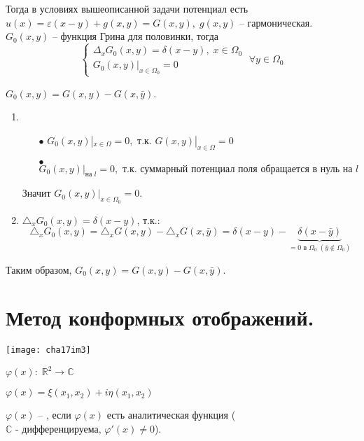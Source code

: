 Тогда в условиях вышеописанной задачи потенциал есть $ u(x) = \varepsilon(x - y) + g(x,y) = G(x, y), \; g(x, y)$ -- гармоническая. $ G_0(x, y) $ -- функция Грина для половинки, тогда
$$\begin{cases}
	\Delta_x G_0(x, y) = \delta(x - y), \; x \in \Omega_0 \\
	G_0(x, y)|_{x \in \Omega_0} = 0
\end{cases} \; \forall y \in \Omega_0$$
\begin{theorem}[]\label{lec:17/the:1}
	$ G_0(x, y) = G(x, y) - G(x, \bar{y}) $.
\end{theorem}
\begin{Proof}
	\begin{enumerate}
		\item 
			\begin{itemize}
				\item[$\bullet$]
					$G_0(x, y)|_{x \in \Omega} = 0, \text{ т.к. } G(x, y)|_{x \in \Omega} = 0$
				\item[$\bullet$]
					$G_0(x, y)|_{\text{на } l} = 0, \text{ т.к. суммарный потенциал поля обращается }\text{в нуль на } l$
			\end{itemize}
			Значит $ G_0(x, y)|_{x \in \Omega_0} = 0 $.
		\item 
			$ \triangle_x G_0(x, y) = \delta(x-y) $, т.к.:
			$$\triangle_x G_0(x, y) = \triangle_x G(x, y) - \triangle_x G(x, \bar{y}) = \delta(x-y) - \underbrace{\delta(x-\bar{y})}_{= 0 \text{ в } \Omega_0 \; \left(\bar{y} \not\in \Omega_0\right)}$$
	\end{enumerate}
	Таким образом, $ G_0(x, y) = G(x, y) - G(x, \bar{y}). $
\end{Proof}

\section*{Метод конформных отображений.}

\begin{center}
		\texttt{[image: cha17im3]}
		
		$ \varphi(x): \; \mathbb{R}^2 \longrightarrow \mathbb{C} $
		
		$ \varphi(x) = \xi(x_1, x_2) + i \eta(x_1, x_2) $
\end{center}

\begin{definition}
	$ \varphi(x) $ -- , если $ \varphi(x) $ есть аналитическая функция ($ \mathbb{C} \text{ - дифференцируема, } \varphi'(x) \neq 0$).
\end{definition}

